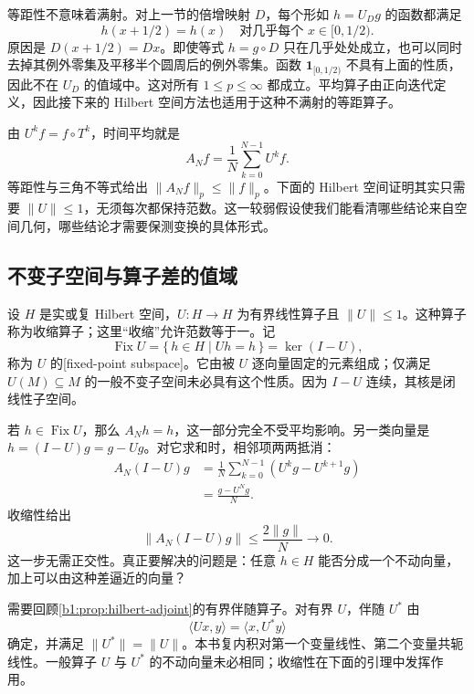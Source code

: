 等距性不意味着满射。对上一节的倍增映射 \(D\)，每个形如 \(h=U_Dg\) 的函数都满足
\[
 h(x+1/2)=h(x)\quad\text{对几乎每个 }x\in[0,1/2).
\]
原因是 \(D(x+1/2)=Dx\)。即使等式 \(h=g\circ D\) 只在几乎处处成立，也可以同时去掉其例外零集及平移半个圆周后的例外零集。函数 \(\mathbf1_{[0,1/2)}\) 不具有上面的性质，因此不在 \(U_D\) 的值域中。这对所有 \(1\leq p\leq\infty\) 都成立。平均算子由正向迭代定义，因此接下来的 Hilbert 空间方法也适用于这种不满射的等距算子。

\ProseParagraphBreak

由 \(U^kf=f\circ T^k\)，时间平均就是
\[
 A_Nf=\frac1N\sum_{k=0}^{N-1}U^kf.
\]
等距性与三角不等式给出 \(\|A_Nf\|_p\leq\|f\|_p\)。下面的 Hilbert 空间证明其实只需要 \(\|U\|\leq1\)，无须每次都保持范数。这一较弱假设使我们能看清哪些结论来自空间几何，哪些结论才需要保测变换的具体形式。

\subsection{不变子空间与算子差的值域}
\label{b1:subsec:320202}

设 \(H\) 是实或复 Hilbert 空间，\(U\colon H\rightarrow H\) 为有界线性算子且 \(\|U\|\leq1\)。这种算子称为收缩算子；这里“收缩”允许范数等于一。记
\[
 \operatorname{Fix}U=\{\,h\in H\mid Uh=h\,\}=\ker(I-U),
\]
称为 \(U\) 的[fixed-point subspace]。它由被 \(U\) 逐向量固定的元素组成；仅满足 \(U(M)\subseteq M\) 的一般不变子空间未必具有这个性质。因为 \(I-U\) 连续，其核是闭线性子空间。

\ProseParagraphBreak

若 \(h\in\operatorname{Fix}U\)，那么 \(A_Nh=h\)，这一部分完全不受平均影响。另一类向量是 \(h=(I-U)g=g-Ug\)。对它求和时，相邻项两两抵消：
\begin{equation}\label{b1:eq:ergodic-telescope-32}
 \begin{aligned}
 A_N(I-U)g
 &=\frac1N\sum_{k=0}^{N-1}(U^kg-U^{k+1}g)\\
 &=\frac{g-U^Ng}{N}.
 \end{aligned}
\end{equation}
收缩性给出
\[
 \|A_N(I-U)g\|\leq\frac{2\|g\|}{N}\longrightarrow0.
\]
这一步无需正交性。真正要解决的问题是：任意 \(h\in H\) 能否分成一个不动向量，加上可以由这种差逼近的向量？

\ProseParagraphBreak

需要回顾\cref{b1:prop:hilbert-adjoint}的有界伴随算子。对有界 \(U\)，伴随 \(U^*\) 由
\[
 \langle Ux,y\rangle=\langle x,U^*y\rangle
\]
确定，并满足 \(\|U^*\|=\|U\|\)。本书复内积对第一个变量线性、第二个变量共轭线性。一般算子 \(U\) 与 \(U^*\) 的不动向量未必相同；收缩性在下面的引理中发挥作用。

